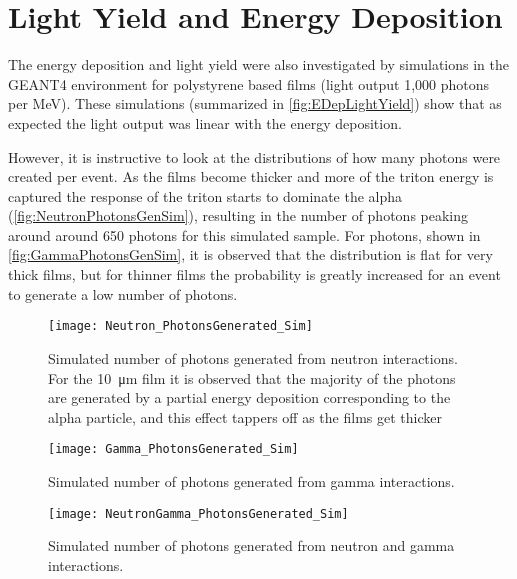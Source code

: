 \section{Light Yield and Energy Deposition}
The energy deposition and light yield were also investigated by simulations in the GEANT4 environment for polystyrene based films (light output 1,000 photons per MeV).
These simulations (summarized in \autoref{fig:EDepLightYield}) show that as expected the light output was linear with the energy deposition.
However, it is instructive to look at the distributions of how many photons were created per event.
As the films become thicker and more of the triton energy is captured the response of the triton starts to dominate the alpha (\autoref{fig:NeutronPhotonsGenSim}), resulting in the number of photons peaking around around 650 photons for this simulated sample.
For photons, shown in \autoref{fig:GammaPhotonsGenSim}, it is observed that the distribution is flat for very thick films, but for thinner films the probability is greatly increased for an event to generate a low number of photons.
\begin{figure}
  \centering
  \texttt{[image: Neutron\_PhotonsGenerated\_Sim]}
  \caption[Number of photons generated from neutron interactions]{Simulated number of photons generated from neutron interactions.  For the \SI{10}{\um} film it is observed that the majority of the photons are generated by a partial energy deposition corresponding to the alpha particle, and this effect tappers off as the films get thicker}
  \label{fig:NeutronPhotonsGenSim}
\end{figure}
\begin{figure}
  \centering
  \texttt{[image: Gamma\_PhotonsGenerated\_Sim]}
  \caption[Number of photons generated from gamma interactions]{Simulated number of photons generated from gamma interactions.}
  \label{fig:GammaPhotonsGenSim}
\end{figure}
\begin{figure}
  \centering
  \texttt{[image: NeutronGamma\_PhotonsGenerated\_Sim]}
  \caption[Number of photons generated of a 1 mm for neutron and gamma interactions]{Simulated number of photons generated from neutron and gamma interactions.}
  \label{fig:NeutronGammaPhotonsGenSim}
\end{figure}
